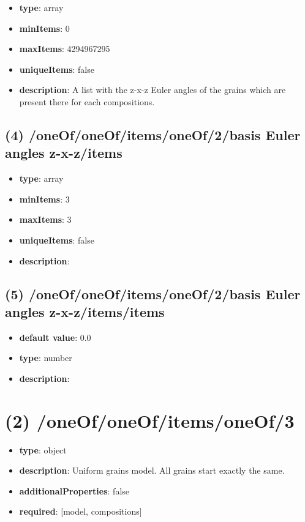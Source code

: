 \begin{itemize}[leftmargin=3em]\item {\bf type}: array
\item {\bf minItems}: 0
\item {\bf maxItems}: 4294967295
\item {\bf uniqueItems}: false
\item {\bf description}: A list with the z-x-z Euler angles of the grains which are present there for each compositions.
\end{itemize}\subsection{(4) /oneOf/oneOf/items/oneOf/2/basis Euler angles z-x-z/items}
\begin{itemize}[leftmargin=4em]\item {\bf type}: array
\item {\bf minItems}: 3
\item {\bf maxItems}: 3
\item {\bf uniqueItems}: false
\item {\bf description}: 
\end{itemize}\subsection{(5) /oneOf/oneOf/items/oneOf/2/basis Euler angles z-x-z/items/items}
\begin{itemize}[leftmargin=5em]\item {\bf default value}: 0.0
\item {\bf type}: number
\item {\bf description}: 
\end{itemize}\section{(2) /oneOf/oneOf/items/oneOf/3}
\begin{itemize}[leftmargin=2em]\item {\bf type}: object
\item {\bf description}: Uniform grains model. All grains start exactly the same.
\item {\bf additionalProperties}: false
\item {\bf required}: [model, compositions]\end{itemize}
